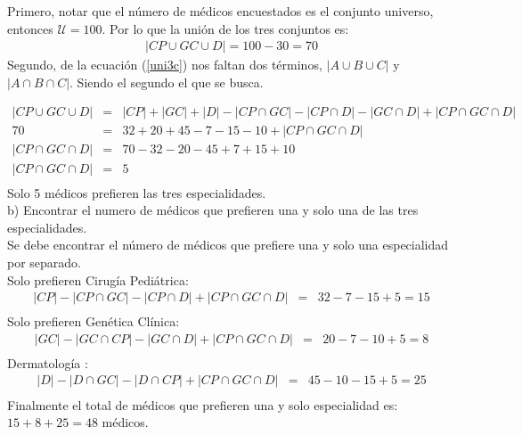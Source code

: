 Primero, notar que el número de médicos encuestados es el conjunto universo, entonces $\mathcal{U}=100$. Por lo que la unión de los tres conjuntos es:\\
\begin{eqnarray*}
|CP\cup GC\cup D|=100-30=70
\end{eqnarray*}
Segundo, de la ecuación (\ref{uni3c}) nos faltan dos términos, $|A\cup B\cup C|$ y $|A\cap B\cap C|$. Siendo el segundo el que se busca.

\begin{eqnarray*}
|CP\cup GC\cup D|&=&|CP|+|GC|+|D|-|CP\cap GC|-|CP\cap D|-|GC\cap D|+|CP\cap GC\cap D| \\
70&=&32+20+45-7-15-10+|CP\cap GC\cap D|\\
|CP\cap GC\cap D|&=&70-32-20-45+7+15+10\\
|CP\cap GC\cap D|&=&5\\
\end{eqnarray*}
Solo 5 médicos prefieren las tres especialidades.\\

\noindent  b) Encontrar el numero de médicos que prefieren una y solo una de las tres especialidades.\\

Se debe encontrar el número de médicos que prefiere una y solo una especialidad por separado.\\

\noindent Solo prefieren Cirugía Pediátrica:
\begin{eqnarray*}
|CP|-|CP\cap GC|-|CP\cap D|+|CP\cap GC\cap D| &=& 32-7-15+5=15\\
\end{eqnarray*}
Solo prefieren Genética Clínica:
\begin{eqnarray*}
|GC|-|GC\cap CP|-|GC\cap D|+|CP\cap GC\cap D| &=&20-7-10+5=8\\
\end{eqnarray*}
Dermatología :
\begin{eqnarray*}
|D|-|D\cap GC|-|D\cap CP|+|CP\cap GC\cap D| &=&45-10-15+5=25\\
\end{eqnarray*}
Finalmente el total de médicos que prefieren una y solo especialidad es: $15+8+25=48$ médicos.\\